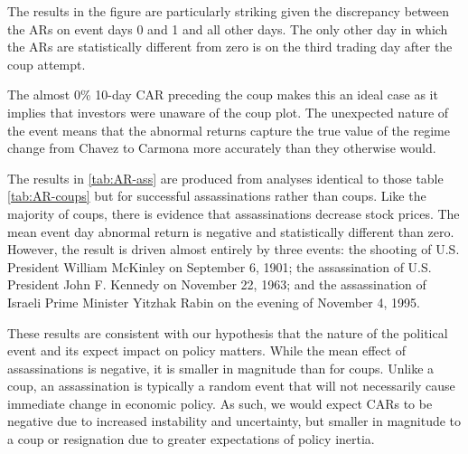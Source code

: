 \documentclass[12pt,final,fleqn]{article}
\theoremstyle{plain}
\begin{document}
The results in the figure are particularly striking given the discrepancy between the ARs on event days 0 and 1 and all other days. The only other day in which the ARs are statistically different from zero is on the third trading day after the coup attempt.

The almost 0\% 10-day CAR preceding the coup makes this an ideal case as it implies that investors were unaware of the coup plot. The unexpected nature of the event means that the abnormal returns capture the true value of the regime change from Chavez to Carmona more accurately than they otherwise would.

The results in \autoref{tab:AR-ass} are produced from analyses identical to those table \autoref{tab:AR-coups} but for successful assassinations rather than coups. Like the majority of coups, there is evidence that assassinations decrease stock prices. The mean event day abnormal return is negative and statistically different than zero. However, the result is driven almost entirely by three events: the shooting of U.S. President William McKinley on September 6, 1901; the assassination of U.S. President John F. Kennedy on November 22, 1963; and the assassination of Israeli Prime Minister Yitzhak Rabin on the evening of November 4, 1995.

These results are consistent with our hypothesis that the nature of the political event and its expect impact on policy matters. While the mean effect of assassinations is negative, it is smaller in magnitude than for coups. Unlike a coup, an assassination is typically a random event that will not necessarily cause immediate change in economic policy. As such, we would expect CARs to be negative due to increased instability and uncertainty, but smaller in magnitude to a coup or resignation due to greater expectations of policy inertia.
\end{document}
